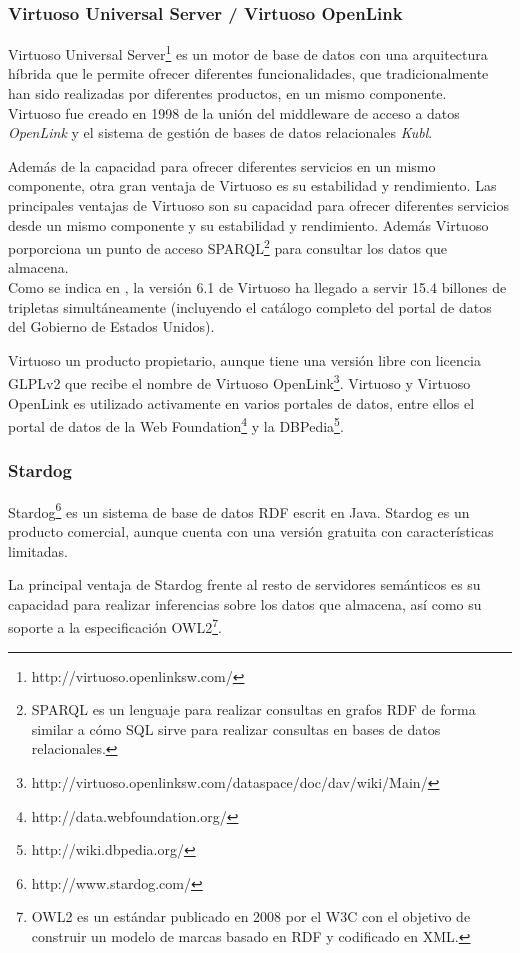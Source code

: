 \subsubsection{Virtuoso Universal Server / Virtuoso OpenLink}
Virtuoso Universal Server\footnote{http://virtuoso.openlinksw.com/} es un motor de base de datos con una arquitectura híbrida que le permite ofrecer diferentes funcionalidades, que tradicionalmente han sido realizadas por diferentes productos, en un mismo componente.\\
Virtuoso fue creado en 1998 de la unión del middleware de acceso a datos \textit{OpenLink}  y el sistema de gestión de bases de datos relacionales \textit{Kubl}.

Además de la capacidad para ofrecer diferentes servicios en un mismo componente, otra gran ventaja de Virtuoso es su estabilidad y rendimiento.  
Las principales ventajas de Virtuoso son su capacidad para ofrecer diferentes servicios desde un mismo componente y su estabilidad y rendimiento. Además Virtuoso porporciona un punto de acceso SPARQL\footnote{SPARQL es un lenguaje para realizar consultas en grafos RDF de forma similar a cómo SQL sirve para realizar consultas en bases de datos relacionales.} para consultar los datos que almacena.\\
Como se indica en \cite[]{largetriplestores}, la versión 6.1 de Virtuoso ha llegado a servir 15.4 billones de tripletas simultáneamente (incluyendo el catálogo completo del portal de datos del Gobierno de Estados Unidos).

Virtuoso un producto propietario, aunque tiene una versión libre con licencia GLPLv2 que recibe el nombre de Virtuoso OpenLink\footnote{http://virtuoso.openlinksw.com/dataspace/doc/dav/wiki/Main/}. Virtuoso y Virtuoso OpenLink es utilizado activamente en varios portales de datos, entre ellos el portal de datos de la Web Foundation\footnote{http://data.webfoundation.org/} y la DBPedia\footnote{http://wiki.dbpedia.org/}.


\subsubsection{Stardog}
Stardog\footnote{http://www.stardog.com/} es un sistema de base de datos RDF escrit en Java. Stardog es un producto comercial, aunque cuenta con una versión gratuita con características limitadas.

La principal ventaja de Stardog frente al resto de servidores semánticos es su capacidad para realizar inferencias sobre los datos que almacena, así como su soporte a la especificación OWL2\footnote{OWL2 es un estándar publicado en 2008 por el W3C con el objetivo de construir un modelo de marcas basado en RDF y codificado en XML.}.

